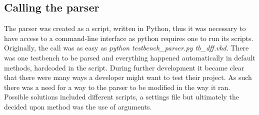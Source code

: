 \documentclass[11pt,british]{article}
\begin{document}
\subsection{Calling the parser}
\label{subsec:parser}
The parser was created as a script, written in Python, thus it was necessary to have access to a command-line interface as python requires one to run its scripts. Originally, the call was as easy as \emph{python testbench\_parser.py tb\_dff.vhd}. There was one testbench to be parsed and everything happened automatically in default methods, hardcoded in the script. During further development it became clear that there were many ways a developer might want to test their project. As such there was a need for a way to the parser to be modified in the way it ran. Possible solutions included different scripts, a settings file but ultimately the decided upon method was the use of arguments.
\end{document}
